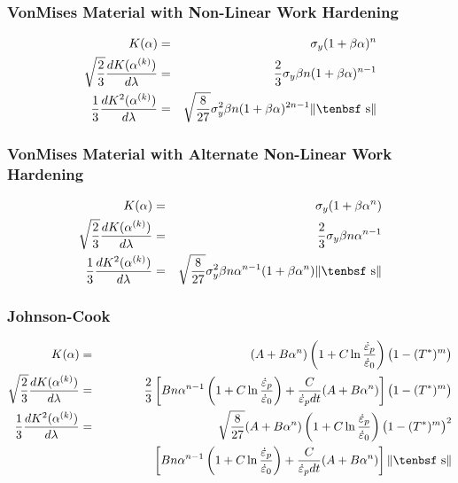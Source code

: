 \documentclass[11pt]{article}
\def\dev{\hbox{\tenbsf s}}
\begin{document}
\subsubsection{VonMises Material with Non-Linear Work Hardening}

\begin{eqnarray}
   K(\alpha) & = & \sigma_y(1+\beta\alpha)^n \\
   \sqrt{2\over3}{dK(\alpha^{(k)})\over d\lambda} & = & {2\over 3} \sigma_y \beta n (1+\beta\alpha)^{n-1} \\
   {1\over3}{dK^2(\alpha^{(k)})\over d\lambda} & = & \sqrt{8\over27} \sigma_y^2 \beta n  (1+\beta\alpha)^{2n-1} \|\dev\|
\end{eqnarray}

\subsubsection{VonMises Material with Alternate Non-Linear Work Hardening}

\begin{eqnarray}
   K(\alpha) & = & \sigma_y(1+\beta\alpha^n) \\
   \sqrt{2\over3}{dK(\alpha^{(k)})\over d\lambda} & = & {2\over 3} \sigma_y \beta n\alpha^{n-1} \\
   {1\over3}{dK^2(\alpha^{(k)})\over d\lambda} & = & \sqrt{8\over27}\sigma_y^2\beta n\alpha^{n-1}(1+\beta\alpha^n)\|\dev\|
\end{eqnarray}

\subsubsection{Johnson-Cook}

\begin{eqnarray}
   K(\alpha) & = &  (A+B\alpha^n)\left(1+C\ln{\dot{\varepsilon}_p\over \dot{\varepsilon}_0}\right)\bigl(1-(T^*)^m\bigr) \\
   \sqrt{2\over3}{dK(\alpha^{(k)})\over d\lambda} & = &  {2\over 3} \left[B n \alpha^{n-1}\left(1+C\ln{\dot{\varepsilon}_p\over \dot{\varepsilon}_0}\right)
                  + {C\over \dot{\varepsilon}_p dt}(A+B\alpha^n)
              \right] \bigl(1-(T^*)^m\bigr)\\
   {1\over3}{dK^2(\alpha^{(k)})\over d\lambda} & = & \sqrt{8\over27}(A+B\alpha^n)\left(1+C\ln{\dot{\varepsilon}_p\over \dot{\varepsilon}_0}\right)
                   \bigl(1-(T^*)^m\bigr)^2  \nonumber \\
    && \qquad\qquad\mbox{}
              \left[B n \alpha^{n-1}\left(1+C\ln{\dot{\varepsilon}_p\over \dot{\varepsilon}_0}\right)
                  + {C\over \dot{\varepsilon}_p dt}(A+B\alpha^n)
              \right]  \|\dev\|
\end{eqnarray}
\end{document}
